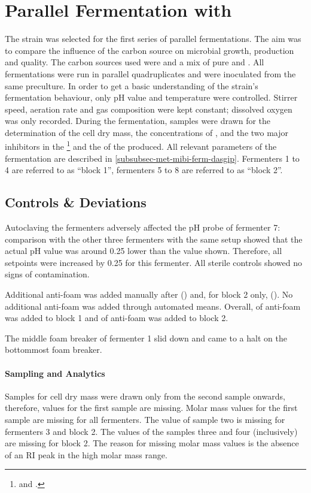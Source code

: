 \section{Parallel Fermentation with \LCH{}\label{sec-lch-pf}}
The strain \strain{} was selected for the first series of parallel fermentations. The aim was to compare the influence of the carbon source on microbial growth, \eps{} production and \eps{} quality. The carbon sources used were \lch{} and a mix of pure \glc{} and \xyl{}. All fermentations were run in parallel quadruplicates and were inoculated from the same preculture. In order to get a basic understanding of the strain's fermentation behaviour, only pH value and temperature were controlled. Stirrer speed, aeration rate and gas composition were kept constant; dissolved oxygen was only recorded. During the fermentation, samples were drawn for the determination of the cell dry mass, the concentrations of \glc{}, \xyl{} and the two major inhibitors in the \lch{}\footnote{\FUR{} and \hmf{}.} and the \amc{} of the \eps{} produced. All relevant parameters of the fermentation are described in \vref{subsubsec-met-mibi-ferm-dasgip}. Fermenters 1 to 4 are referred to as \enquote{block 1}, fermenters 5 to 8 are referred to as \enquote{block 2}.

\subsection{Controls \& Deviations\label{subsec-lch-pf-controls-deviations}}
Autoclaving the fermenters adversely affected the pH probe of fermenter 7: comparison with the other three fermenters with the same setup showed that the actual pH value was around \num{0.25} lower than the value shown. Therefore, all setpoints were increased by \num{0.25} for this fermenter. All sterile controls showed no signs of contamination.

Additional anti-foam was added manually after  () and, for block 2 only,  (). No additional anti-foam was added through automated means. Overall,  of anti-foam was added to block 1 and  of anti-foam was added to block 2.

The middle foam breaker of fermenter 1 slid down and came to a halt on the bottommost foam breaker.

\paragraph{Sampling and Analytics\label{para-lch-pf-sampling}}
Samples for cell dry mass were drawn only from the second sample onwards, therefore, values for the first sample are missing. Molar mass values for the first sample are missing for all fermenters. The value of sample two is missing for fermenters 3 and block 2. The values of the samples three and four (inclusively) are missing for block 2. The reason for missing molar mass values is the absence of an RI peak in the high molar mass range.

